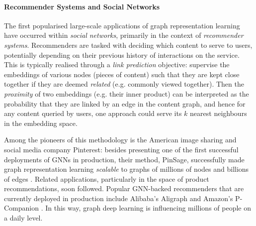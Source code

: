 \paragraph{Recommender Systems and Social Networks} The first popularised large-scale applications of graph representation learning have occurred within \emph{social networks}, primarily in the context of \emph{recommender systems}. Recommenders are tasked with deciding which content to serve to users, potentially depending on their previous history of interactions on the service. This is typically realised through a \emph{link prediction} objective: supervise the embeddings of various nodes (pieces of content) such that they are kept close together if they are deemed \emph{related} (e.g. commonly viewed together). Then the \emph{proximity} of two embeddings (e.g. their inner product) can be interpreted as the probability that they are linked by an edge in the content graph, and hence for any content queried by users, one approach could serve its $k$ nearest neighbours in the embedding space.

Among the pioneers of this methodology is the American image sharing and social media company Pinterest: besides presenting one of the first successful deployments of GNNs in production, their method, PinSage, successfully made graph representation learning \emph{scalable} to graphs of millions of nodes and billions of edges \citep{ying2018graph}. Related applications, particularly in the space of product recommendations, soon followed. Popular GNN-backed recommenders that are currently deployed in production include Alibaba's Aligraph \citep{zhu2019aligraph} and Amazon's P-Companion \citep{hao2020p}. In this way, graph deep  learning is influencing millions of people on a daily level.


